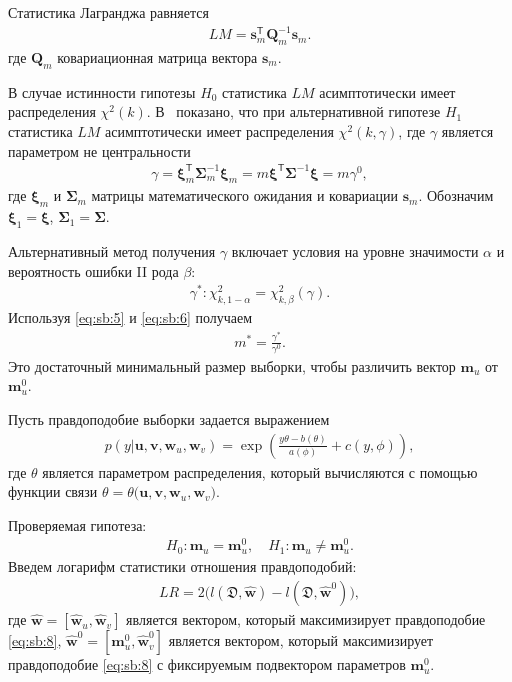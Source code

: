 Статистика Лагранджа равняется
\[
\label{eq:sb:4}
\begin{aligned}
	LM = \textbf{s}^{\mathsf{T}}_{m}\textbf{Q}_{m}^{-1}\textbf{s}_{m}.
\end{aligned}
\]
где $\textbf{Q}_{m}$ ковариационная матрица вектора $\textbf{s}_{m}$.
	
В случае истинности гипотезы $H_0$ статистика $LM$ асимптотически имеет распределения $\chi^2(k)$.  В~\cite{self1988} показано, что при альтернативной гипотезе $H_1$ статистика  $LM$ асимптотически имеет распределения $\chi^2(k,\gamma)$, где $\gamma$ является параметром не центральности
\[
\label{eq:sb:5}
\begin{aligned}
	\gamma = \bm{\xi}_{m}^{\mathsf{T}}\bm{\Sigma}^{-1}_{m}\bm{\xi}_{m} = m\bm{\xi}^{\mathsf{T}}\bm{\Sigma}^{-1}\bm{\xi}= m\gamma^0,
\end{aligned}
\]
где $\bm{\xi}_{m}$ и $\bm{\Sigma}_{m}$ матрицы математического ожидания и ковариации $\textbf{s}_{m}$. Обозначим $\bm{\xi}_1 = \bm{\xi}$,  $\bm{\Sigma}_1 = \bm{\Sigma}$. 
	
Альтернативный метод получения $\gamma$ включает условия на уровне значимости $\alpha$ и вероятность ошибки II рода $\beta$:
\[
\label{eq:sb:6}
\begin{aligned}
	\gamma^*:\chi^2_{k, 1-\alpha} = \chi^2_{k, \beta}\left(\gamma\right).
\end{aligned}
\]
Используя \eqref{eq:sb:5} и \eqref{eq:sb:6} получаем
\[
\label{eq:sb:7}
\begin{aligned}
	m^* = \frac{\gamma^*}{\gamma^0}.
\end{aligned}
\]
Это достаточный минимальный размер выборки, чтобы различить вектор $\textbf{m}_{u}$ от $\textbf{m}^0_{u}$.

Пусть правдоподобие выборки задается выражением
\[
\label{eq:sb:8}
\begin{aligned}
	p(y|\textbf{u},\textbf{v},\textbf{w}_{u},\textbf{w}_{v}) = \exp\left(\frac{y\theta- b(\theta)}{a(\phi)} + c\left(y, \phi\right)\right),
\end{aligned}
\]
где $\theta$ является параметром распределения, который вычисляются с помощью функции связи $\theta=\theta\bigr(\textbf{u},\textbf{v},\textbf{w}_{u},\textbf{w}_{v}\bigr)$.

Проверяемая гипотеза:
\[
\label{eq:sb:9}
\begin{aligned}
	H_0: \textbf{m}_{u} = \textbf{m}^0_{u}, \quad H_1: \textbf{m}_{u} \not= \textbf{m}^0_{u}.
\end{aligned}
\]
Введем логарифм статистики отношения правдоподобий:
\[
\label{eq:sb:10}
\begin{aligned}
	LR = 2\Big(l\left(\mathfrak{D}, \hat{\textbf{w}}\right) - l\left(\mathfrak{D}, \hat{\textbf{w}}^0\right)\Big),
\end{aligned}
\]
где $\hat{\textbf{w}} = [\hat{\textbf{w}}_{u},\hat{\textbf{w}}_{v}]$ является вектором, который максимизирует правдоподобие \eqref{eq:sb:8}, $\hat{\textbf{w}}^{0} = [\textbf{m}^{0}_{u},\hat{\textbf{w}}^{0}_{v}]$ является вектором, который максимизирует правдоподобие \eqref{eq:sb:8} с фиксируемым подвектором параметров $\textbf{m}^{0}_{u}$.

